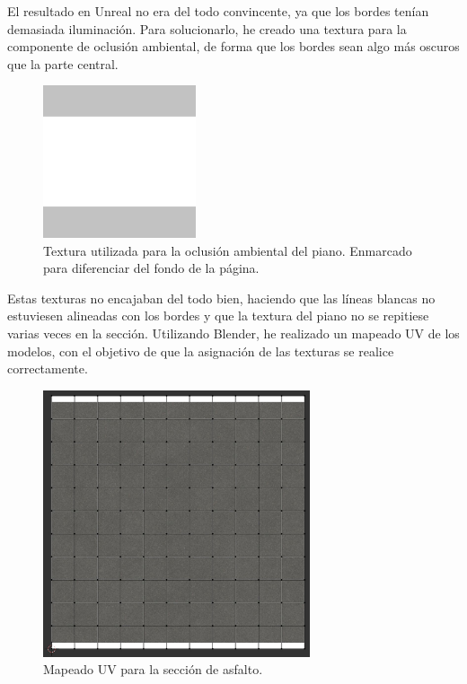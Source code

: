 El resultado en Unreal no era del todo convincente, ya que los bordes tenían demasiada iluminación. Para solucionarlo, he creado una textura para la componente de oclusión ambiental, de forma que los bordes sean algo más oscuros que la parte central. 

\begin{figure}[H]
    \centering
    \includegraphics[width=0.4\textwidth,cframe=black 0.5pt 0pt]{imagenes/converted/pista/kerb-dirty2-AO.jpg}
    \caption{Textura utilizada para la oclusión ambiental del piano. Enmarcado para diferenciar del fondo de la página.}
    \label{fig:pianoao}
\end{figure}

Estas texturas no encajaban del todo bien, haciendo que las líneas blancas no estuviesen alineadas con los bordes y que la textura del piano no se repitiese varias veces en la sección. Utilizando Blender, he realizado un mapeado UV de los modelos, con el objetivo de que la asignación de las texturas se realice correctamente.

\begin{figure}[H]
    \centering
    \includegraphics[width=0.7\textwidth]{imagenes/converted/pista/uv-straight.jpg}
    \caption{Mapeado UV para la sección de asfalto.}
    \label{fig:uvasphalt}
\end{figure}

